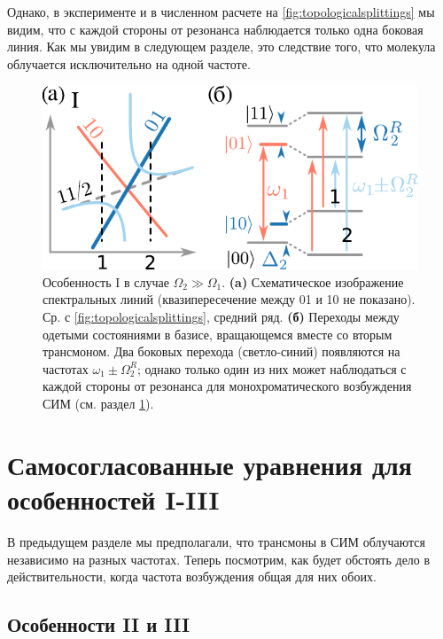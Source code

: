 \documentclass[14pt, a4paper]{extreport}
\numberwithin{equation}{section}
\begin{document}
Однако, в эксперименте и в численном расчете на \autoref{fig:topologicalsplittings} мы видим, что с каждой стороны от резонанса наблюдается только одна боковая линия. Как мы увидим в следующем разделе, это следствие того, что молекула облучается исключительно на одной частоте.


\begin{figure}
	\centering
	\includegraphics[width=.6\linewidth]{topo_scheme}
	\caption{Особенность I в случае $\Omega_2 \gg \Omega_1$. \textbf{(a)} Схематическое изображение спектральных линий (квазипересечение между 01 и 10 не показано). Ср. с \autoref{fig:topologicalsplittings}, средний ряд. \textbf{(б)} Переходы между одетыми состояниями в базисе, вращающемся вместе со вторым трансмоном. Два боковых перехода (светло-синий) появляются на частотах $\omega_1\pm\Omega_2^R$; однако только один из них может наблюдаться с каждой стороны от резонанса для монохроматического возбуждения СИМ (см. раздел \ref{sec:munhgausen}).}
	\label{fig:featureI}
\end{figure} 

\section{Самосогласованные уравнения для особенностей I-III}\label{sec:munhgausen}

В предыдущем разделе мы предполагали, что трансмоны в СИМ облучаются независимо на разных частотах. Теперь посмотрим, как будет обстоять дело в действительности, когда частота возбуждения общая для них обоих.

\subsection{Особенности II и III}
\end{document}
